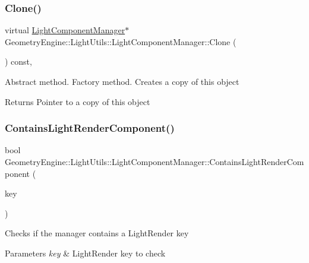 \subsubsection{\texorpdfstring{Clone()}{Clone()}}
{\footnotesize\ttfamily virtual \mbox{\hyperlink{class_geometry_engine_1_1_light_utils_1_1_light_component_manager}{Light\+Component\+Manager}}$\ast$ Geometry\+Engine\+::\+Light\+Utils\+::\+Light\+Component\+Manager\+::\+Clone (\begin{DoxyParamCaption}{ }\end{DoxyParamCaption}) const\hspace{0.3cm}{\ttfamily [inline]}, {\ttfamily [virtual]}}

Abstract method. Factory method. Creates a copy of this object \begin{DoxyReturn}{Returns}
Pointer to a copy of this object 
\end{DoxyReturn}
\mbox{\label{class_geometry_engine_1_1_light_utils_1_1_light_component_manager_a938dfaba1159f85fbfcae097a867644a}} 
\subsubsection{\texorpdfstring{ContainsLightRenderComponent()}{ContainsLightRenderComponent()}}
{\footnotesize\ttfamily bool Geometry\+Engine\+::\+Light\+Utils\+::\+Light\+Component\+Manager\+::\+Contains\+Light\+Render\+Component (\begin{DoxyParamCaption}\item[{\mbox{\hyperlink{namespace_geometry_engine_1_1_light_utils_ac3078de660742daceaa06bd9bc61d24a}{Light\+Render}}}]{key }\end{DoxyParamCaption})\hspace{0.3cm}{\ttfamily [inline]}}

Checks if the manager contains a Light\+Render key 
\begin{DoxyParams}{Parameters}
{\em key} & Light\+Render key to check \\
\hline
\end{DoxyParams}
\mbox{\label{class_geometry_engine_1_1_light_utils_1_1_light_component_manager_a453eb8a7b769afeb7b3c72489426b7b4}} 
